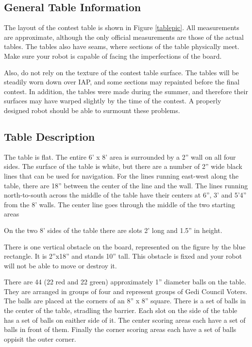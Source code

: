 
\subsection{General Table Information}

The layout of the contest table is shown in Figure
\ref{tablepic}. All measurements are approximate, although the only official
measurements are those of the actual tables.  The tables also have
seams, where sections of the table physically meet.  Make sure your
robot is capable of facing the imperfections of the board.

Also, do not rely on the texture of the contest table surface. The
tables will be steadily worn down over IAP, and some sections may
repainted before the final contest.  In addition, the tables were made
during the summer, and therefore their surfaces may have warped
slightly by the time of the contest.  A properly designed robot should
be able to surmount these problems.
 
\subsection{Table Description}

The table is flat. The entire 6' x 8' area is surrounded by a 2'' wall
on all four sides.  The surface of the table is white, but there are a
number of 2'' wide black lines that can be used for navigation.  For
the lines running east-west along  the table, there are 18'' between
the center of the line and the wall.  The lines running north-to-south
across the middle of the table have their centers at 6'', 3' and 5'4'' from the 8' walls.
The center line goes through the middle of the two starting areas

On the two 8' sides of the table there are slots 2' long and 1.5'' in height.

There is one vertical obstacle on the board, represented on the
figure by the blue rectangle.  It is 2''x18'' and
stands 10'' tall.  This obstacle is fixed and your robot will not be able to
move or destroy it.  

There are 44 (22 red and 22 green) approximately 1'' diameter balls on the table.
They are arranged in groups of four and represent groups of Gedi Council Voters. The balls are placed at the corners of an 8'' x 8'' square. There is a set of balls in the center of the table, stradling the barrier. Each slot on the side of the table has a set of balls on eaither side of it. The center scoring areas each have a set of balls in front of them. Finally the corner scoring areas each have a set of balls oppisit the outer corner.

